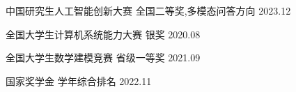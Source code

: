 

\Award
  {中国研究生人工智能创新大赛}
  {全国二等奖\sep 多模态问答方向}
  {2023.12}

\Award
  {全国大学生计算机系统能力大赛}
  {银奖}
  {2020.08}

\Award
  {全国大学生数学建模竞赛}
  {省级一等奖}
  {2021.09}

\Award
  {国家奖学金}
  {学年综合排名 }
  {2022.11}
